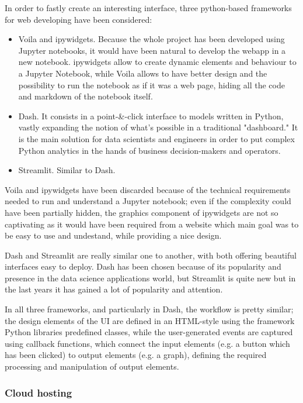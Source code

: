 In order to fastly create an interesting interface, three python-based frameworks for web developing have been considered:
\begin{itemize}
    \item Voila and ipywidgets. Because the whole project has been developed using Jupyter notebooks, it would have
    been natural to develop the webapp in a new notebook. ipywidgets allow to create dynamic elements and behaviour to
    a Jupyter Notebook, while Voila allows to have better design and the possibility to run the notebook as if it was
    a web page, hiding all the code and markdown of the notebook itself.
    \item Dash. It consists in a point-\&-click interface to models written in Python, vastly expanding the notion of
    what's possible in a traditional "dashboard." It is the main solution for data scientists and engineers in order to
    put complex Python analytics in the hands of business decision-makers and operators.
    \item Streamlit. Similar to Dash.
\end{itemize}
Voila and ipywidgets have been discarded because of the technical requirements needed to run and understand a Jupyter
notebook; even if the complexity could have been partially hidden, the graphics component of ipywidgets are not so
captivating as it would have been required from a website which main goal was to be easy to use and undestand, while
providing a nice design.

Dash and Streamlit are really similar one to another, with both offering beautiful interfaces easy to deploy. Dash has
been chosen because of its popularity and presence in the data science applications world, but Streamlit is quite new
but in the last years it has gained a lot of popularity and attention.

In all three frameworks, and particularly in Dash, the workflow is pretty similar; the design elements of the UI are
defined in an HTML-style using the framework Python libraries predefined classes, while the user-generated events are
captured using callback functions, which connect the input elements (e.g. a button which has been clicked) to output
elements (e.g. a graph), defining the required processing and manipulation of output elements.

\subsubsection{Cloud hosting}

